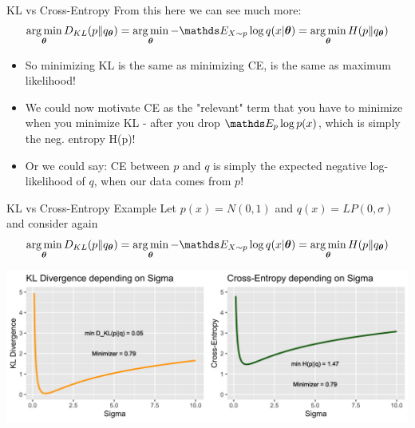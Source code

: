 \documentclass[11pt,compress,t,notes=noshow, xcolor=table]{beamer}
\begin{document}
\begin{vbframe}{KL vs Cross-Entropy}
From this here we can see much more:
$$ \argmin_{\thetav} D_{KL}(p \| q_{\thetav}) = \argmin_{\thetav} -\E_{X \sim p} \log q(x|\thetav) = \argmin_{\thetav} H(p \| q_{\thetav}) $$
  \begin{itemize}
    \item So minimizing KL is the same as minimizing CE, is the same as maximum likelihood!
    \item We could now motivate CE as the "relevant" term that you have to minimize when you minimize KL - after you drop $\E_p \log p(x)$, which is simply the neg. entropy H(p)!
    \item Or we could say: CE between $p$ and $q$ is simply the expected negative log-likelihood of $q$, when our data comes from $p$!
  \end{itemize}
\end{vbframe}

\begin{vbframe}{KL vs Cross-Entropy Example}
Let $p(x)=N(0,1)$ and $q(x)=LP(0,\sigma)$ and consider again
$$ \argmin_{\thetav} D_{KL}(p \| q_{\thetav}) = \argmin_{\thetav} -\E_{X \sim p} \log q(x|\thetav) = \argmin_{\thetav} H(p \| q_{\thetav}) $$

\begin{center}
	\includegraphics[width=1\textwidth]{figure/kl_ce_comparison.png}
\end{center}

\end{vbframe}
\end{document}
